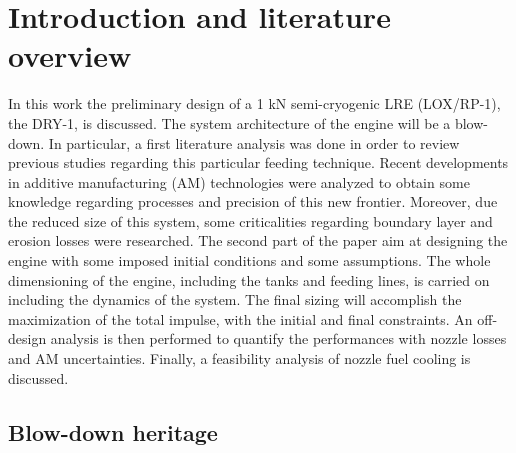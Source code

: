 \section{Introduction and literature overview}
\label{sec:introduction}

In this work the preliminary design of a 1 kN semi-cryogenic LRE (LOX/RP-1), the DRY-1, is discussed. The system architecture of the engine will be a blow-down. In particular, a first literature analysis was done in order to review previous studies regarding this particular feeding technique. Recent developments in additive manufacturing (AM) technologies were analyzed to obtain some knowledge regarding processes and precision of this new frontier. Moreover, due the reduced size of this system, some criticalities regarding boundary layer and erosion losses were researched.
The second part of the paper aim at designing the engine with some imposed initial conditions and some assumptions. The whole dimensioning of the engine, including the tanks and feeding lines, is carried on including the dynamics of the system. The final sizing will accomplish the maximization of the total impulse, with the initial and final constraints. 
An off-design analysis is then performed to quantify the performances with nozzle losses and AM uncertainties. Finally, a feasibility analysis of  nozzle fuel cooling is discussed.

\subsection{Blow-down heritage}
\label{subsec:blowdown_intro}

